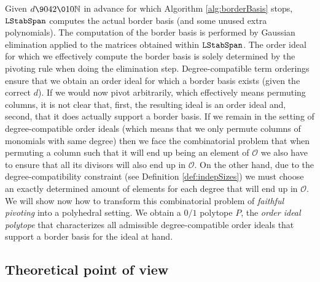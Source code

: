 \documentclass[11pt,oneside,english]{amsart}
\makeatletter
\numberwithin{equation}{section}
\numberwithin{figure}{section}
\theoremstyle{plain}
\theoremstyle{definition}
\theoremstyle{definition}
\theoremstyle{remark}
\theoremstyle{plain}
\theoremstyle{plain}
\theoremstyle{plain}
\theoremstyle{problem@}
\newcounter{problem}
\makeatother
\begin{document}
Given $d{\9042\010}{\mathbb{N}}$ in advance for which Algorithm \ref{alg:borderBasis}
stops, ${\ensuremath{\operatorname{{\textnormal{\texttt{{LStabSpan}}}}}}}$ computes the actual border basis (and some unused
extra polynomials). The computation of the border basis is performed
by Gaussian elimination applied to the matrices obtained within ${\ensuremath{\operatorname{{\textnormal{\texttt{{LStabSpan}}}}}}}$.
The order ideal for which we effectively compute the border basis
is solely determined by the pivoting rule when doing the elimination
step. Degree-compatible term orderings ensure that we obtain an order
ideal for which a border basis exists (given the correct $d$). If
we would now pivot arbitrarily, which effectively means permuting
columns, it is not clear that, first, the resulting ideal is an order
ideal and, second, that it does actually support a border basis. If
we remain in the setting of degree-compatible order ideals (which
means that we only permute columns of monomials with same degree)
then we face the combinatorial problem that when permuting a column
such that it will end up being an element of ${\mathcal{O}}$ we also have to
ensure that all its divisors will also end up in ${\mathcal{O}}$. On the other
hand, due to the degree-compatibility constraint (see Definition \ref{def:indepSizes})
we must choose an exactly determined amount of elements for each degree
that will end up in ${\mathcal{O}}$. We will show now how to transform this
combinatorial problem of \emph{faithful pivoting} into a polyhedral
setting. We obtain a $0/1$ polytope $P$, the \emph{order ideal polytope}
that characterizes all admissible degree-compatible order ideals that
support a border basis for the ideal at hand.

\subsection{Theoretical point of view}
\label{sec:theor-viewp}
\end{document}
